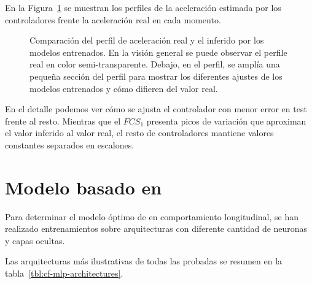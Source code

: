 En la Figura~\ref{fig:fcs-test-comparisons} se muestran los perfiles de la aceleración estimada por los controladores frente la aceleración real en cada momento. 

\begin{figure}
	\centering
	\qquad
	\caption[Comparación del perfil de aceleración real y el inferido por los modelos entrenados]{Comparación del perfil de aceleración real y el inferido por los modelos entrenados. En la visión general se puede observar el perfile real en color semi-transparente. Debajo, en el perfil, se amplía una pequeña sección del perfil para mostrar los diferentes ajustes de los modelos entrenados y cómo difieren del valor real.}
	\label{fig:fcs-test-comparisons}
\end{figure}

En el detalle podemos ver cómo se ajusta el controlador con menor error en test frente al resto. Mientras que el $FCS_1$ presenta picos de variación que aproximan el valor inferido al valor real, el resto de controladores mantiene valores constantes separados en escalones.

\section{Modelo basado en }

Para determinar el modelo óptimo de  en comportamiento longitudinal, se han realizado entrenamientos sobre arquitecturas con diferente cantidad de neuronas y capas ocultas.

Las arquitecturas más ilustrativas de todas las probadas se resumen en la tabla~\ref{tbl:cf-mlp-architectures}.

